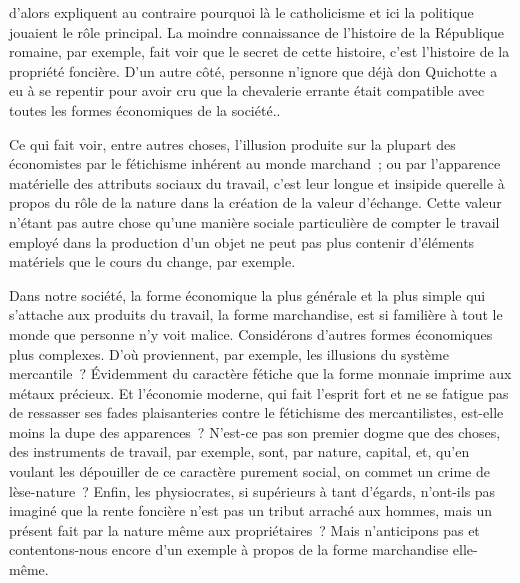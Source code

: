 \documentclass[french,twoside]{book} %
\begin{document}
{d’alors expliquent au contraire pourquoi là le catholicisme et ici la politique jouaient le rôle principal. La moindre connaissance de l’histoire de la République romaine, par exemple, fait voir que le secret de cette histoire, c’est l’histoire de la propriété foncière. D’un autre côté, personne n’ignore que déjà don Quichotte a eu à se repentir pour avoir cru que la chevalerie errante était compatible avec toutes les formes économiques de la société.}.\par
Ce qui fait voir, entre autres choses, l’illusion produite sur la plupart des économistes par le fétichisme inhérent au monde marchand ; ou par l’apparence matérielle des attributs sociaux du travail, c’est leur longue et insipide querelle à propos du rôle de la nature dans la création de la valeur d’échange. Cette valeur n’étant pas autre chose qu’une manière sociale particulière de compter le travail employé dans la production d’un objet ne peut pas plus contenir d’éléments matériels que le cours du change, par exemple.\par
Dans notre société, la forme économique la plus générale et la plus simple qui s’attache aux produits du travail, la forme marchandise, est si familière à tout le monde que personne n’y voit malice. Considérons d’autres formes économiques plus complexes. D’où proviennent, par exemple, les illusions du système mercantile ? Évidemment du caractère fétiche que la forme monnaie imprime aux métaux précieux. Et l’économie moderne, qui fait l’esprit fort et ne se fatigue pas de ressasser ses fades plaisanteries contre le fétichisme des mercantilistes, est-elle moins la dupe des apparences ? N’est-ce pas son premier dogme que des choses, des instruments de travail, par exemple, sont, par nature, capital, et, qu’en voulant les dépouiller de ce caractère purement social, on commet un crime de lèse-nature ? Enfin, les physiocrates, si supérieurs à tant d’égards, n’ont-ils pas imaginé que la rente foncière n’est pas un tribut arraché aux hommes, mais un présent fait par la nature même aux propriétaires ? Mais n’anticipons pas et contentons-nous encore d’un exemple à propos de la forme marchandise elle-même.\par
\end{document}
